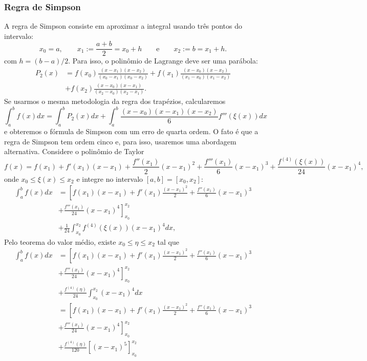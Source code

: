 \subsubsection{Regra de Simpson}
A regra de Simpson consiste em aproximar a integral usando três pontos do intervalo:
$$
x_0=a,\qquad x_1:=\frac{a+b}{2}=x_0+h \qquad \text{e}\qquad x_2:=b=x_1+h.
$$
com $h = (b-a)/2$. Para isso, o polinômio de Lagrange deve ser uma parábola:
\begin{equation*}
  \begin{split}
    P_2(x) &= f(x_0)\frac{(x-x_1)(x-x_2)}{(x_0-x_1)(x_0-x_2)} + f(x_1)\frac{(x-x_0)(x-x_2)}{(x_1-x_0)(x_1-x_2)}\\
    &+ f(x_2)\frac{(x-x_0)(x-x_1)}{(x_2-x_0)(x_2-x_1)}.
  \end{split}
\end{equation*}
Se usarmos o mesma metodologia da regra dos trapézios, calcularemos
$$
\int_a^bf(x)dx=\int_a^bP_2(x)dx+\int_a^b\frac{(x-x_0)(x-x_1)(x-x_2)}{6}f'''(\xi(x))dx
$$
e obteremos o fórmula de Simpson com um erro de quarta ordem. O fato é que a regra de Simpson tem ordem cinco e, para isso, usaremos uma abordagem alternativa. Considere o polinômio de Taylor
$$
f(x)=f(x_1)+f'(x_1)(x-x_1)+\frac{f''(x_1)}{2}(x-x_1)^2+\frac{f'''(x_1)}{6}(x-x_1)^3+\frac{f^{(4)}(\xi(x))}{24}(x-x_1)^4,
$$
onde $x_0\leq\xi(x)\leq x_2$ e integre no intervalo $[a,b]=[x_0,x_2]$:
\begin{equation*}
  \begin{split}
    \int_a^bf(x)dx&= \left[f(x_1)(x-x_1)+f'(x_1)\frac{(x-x_1)^2}{2} + \frac{f''(x_1)}{6}(x-x_1)^3\right. \\
      &\left. + \frac{f'''(x_1)}{24}(x-x_1)^4\right]_{x_0}^{x_2}\\
      &+ \frac{1}{24}\int_{x_0}^{x_2}f^{(4)}(\xi(x))(x-x_1)^4dx,    
  \end{split}
\end{equation*}
Pelo teorema do valor médio, existe $x_0\leq\eta\leq x_2$ tal que
\begin{equation*}
  \begin{split}
    \int_a^bf(x)dx&= \left[f(x_1)(x-x_1)+f'(x_1)\frac{(x-x_1)^2}{2}+\frac{f''(x_1)}{6}(x-x_1)^3\right.\\
    &+\left.\frac{f'''(x_1)}{24}(x-x_1)^4\right]_{x_0}^{x_2}\\
    &+ \frac{f^{(4)}(\eta)}{24}\int_{x_0}^{x_2}(x-x_1)^4dx\\
    &= \left[f(x_1)(x-x_1)+f'(x_1)\frac{(x-x_1)^2}{2}+\frac{f''(x_1)}{6}(x-x_1)^3\right.\\
    &+\left.\frac{f'''(x_1)}{24}(x-x_1)^4\right]_{x_0}^{x_2}\\
    &+ \frac{f^{(4)}(\eta)}{120}\left[(x-x_1)^5\right]_{x_0}^{x_2}    
  \end{split}
\end{equation*}
